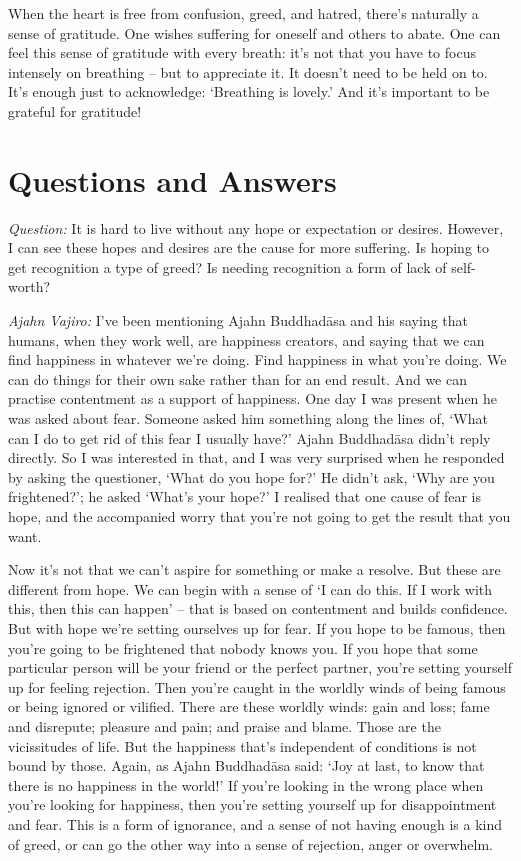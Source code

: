 \enlargethispage{2\baselineskip}

When the heart is free from confusion, greed, and hatred, there's naturally a
sense of gratitude. One wishes suffering for oneself and others to abate. One
can feel this sense of gratitude with every breath: it's not that you have to
focus intensely on breathing -- but to appreciate it. It doesn't need to be held
on to. It's enough just to acknowledge: `Breathing is lovely.' And it's
important to be grateful for gratitude!

\clearpage

\section{Questions and Answers}

\emph{Question:} It is hard to live without any hope or expectation or desires.
However, I can see these hopes and desires are the cause for more suffering. Is
hoping to get recognition a type of greed? Is needing recognition a form of lack
of self-worth?

\emph{Ajahn Vajiro:} I've been mentioning Ajahn Buddhadāsa and his saying that humans,
when they work well, are happiness creators, and saying that we can find
happiness in whatever we're doing. Find happiness in what you're doing. We can do things for their own sake rather than for an end result.
And we can practise contentment as a support of happiness.
One day I was present when he was asked about fear.
Someone asked him something along the lines of, `What can I do to get rid of this fear I usually have?' Ajahn Buddhadāsa didn't
reply directly. So I was interested in that, and I was very surprised when he
responded by asking the questioner, `What do you hope for?' He didn't ask, `Why
are you frightened?'; he asked `What's your hope?' I realised that one cause of fear is hope, and the accompanied
worry that you're not going to get the result that you want.

\enlargethispage{2\baselineskip}

Now it's not that we can't aspire for something or make a resolve. But these
are different from hope. We can begin with a sense of `I can do this. If I
work with this, then this can happen' -- that is based on contentment and builds confidence. But with
hope we're setting ourselves up for fear. If you hope to be famous, then
you're going to be frightened that nobody knows you. If you hope that some
particular person will be your friend or the perfect partner, you're setting
yourself up for feeling rejection. Then you're caught in the worldly winds of
being famous or being ignored or vilified. There are these worldly winds: gain
and loss; fame and disrepute; pleasure and pain; and praise and blame. Those are
the vicissitudes of life. But the happiness that's independent of conditions is
not bound by those. Again, as Ajahn Buddhadāsa said: `Joy at last, to know that
there is no happiness in the world!' If you're looking in the wrong place when
you're looking for happiness, then you're setting yourself up for disappointment
and fear. This is a form of ignorance, and a sense of not having enough is a
kind of greed, or can go the other way into a sense of rejection, anger or
overwhelm.

